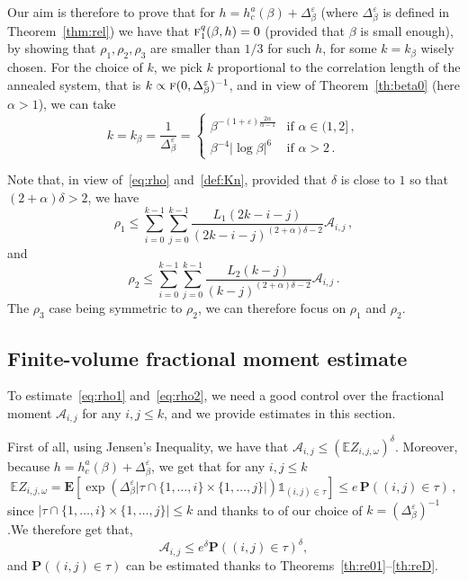 \documentclass[10pt]{amsart}
\theoremstyle{definition}\newtheorem{defi}[theo]{Definition}\newtheorem{rema}[theo]{Remark}\newtheorem{exam}[theo]{Example}\newtheorem{exem}[theo]{Example}\newtheorem{nota}[theo]{Notation}
\newcommand{\ga}{\alpha}
\newcommand{\gb}{\beta}
\newcommand{\gd}{\delta}
\newcommand{\gep}{\varepsilon}
\newcommand{\gD}{\Delta}
\newcommand{\unbf}%
{\mathds{1}}
\newcommand{\tf}{\textsc{f}} %
\newcommand{\cA}{\ensuremath{\mathcal{A}}}
\newcommand{\bP}{\ensuremath{\mathbf{P}}}
\newcommand{\bE}{\ensuremath{\mathbf{E}}}
\newcommand{\bbE}{\ensuremath{\mathbb{E}}}
\begin{document}
Our aim is therefore to prove that for $h=h_c^a(\gb) + \gD_{\gb}^{\gep}$ (where $\gD_\gb^{\gep}$ is defined in Theorem~\ref{thm:rel}) we have that $\tf_1^{q}(\gb,h) =0$ (provided that $\gb$ is small enough), by showing that $\rho_1,\rho_2,\rho_3$ are smaller than $1/3$ for such $h$, for some $k=k_{\gb}$ wisely chosen. For the choice of $k$, we pick $k$ proportional to the correlation length of the annealed system, that is $k \propto \tf(0,\gD_{\gb}^{\gep})^{-1}$, and in view of Theorem~\ref{th:beta0} (here $\ga>1$), we can take
\begin{equation}\label{def:k}
k = k_{\gb} = \frac{1}{\gD_{\gb}^{\gep}} =
\begin{cases}
\gb^{ - (1+\gep)\frac{2\ga}{\ga-1} } &\text{if } \ga\in(1,2]\,, \\
\gb^{-4} |\log \gb |^{6} &\text{if } \ga>2\,.
\end{cases}
\end{equation}



Note that, in view of~\eqref{eq:rho} and~\eqref{def:Kn}, provided that $\gd$ is close to $1$ so that $(2+\ga)\gd >2$, we have
\begin{equation}\label{eq:rho1}
\rho_1 \le \sum_{i=0}^{k-1} \sum_{j=0}^{k-1} \frac{L_1(2 k -i -j)}{(2k -i -j)^{(2+\ga) \delta - 2}} \cA_{i,j}\,,
\end{equation}
and
\begin{equation}\label{eq:rho2}
\rho_2 \le \sum_{i=0}^{k-1} \sum_{j=0}^{k-1} \frac{L_2(k-j)}{(k-j)^{(2+\ga)\delta -2}} \cA_{i,j}\,.
\end{equation}
The $\rho_3$ case being symmetric to $\rho_2$, we can therefore focus on $\rho_1$ and $\rho_2$.


\subsection{Finite-volume fractional moment estimate}\label{sec:com}
To estimate~\eqref{eq:rho1} and~\eqref{eq:rho2}, we need a good control over the fractional moment $\cA_{i,j}$ for any $i,j\leq k$, and we provide estimates in this section.

First of all, using Jensen's Inequality, we have that $\cA_{i,j} \le { (\bbE Z_{i,j,\omega})}^\delta$. Moreover, because $h=h_c^a(\gb)+\gD_{\gb}^\gep$, we get that for any $i,j\leq k$
\[
\bbE Z_{i,j,\omega} = \bE \left[\exp \left(\gD_{\gb}^{\gep} \vert \tau \cap \lbrace 1,\dots,i \rbrace \times \lbrace 1,\dots, j \rbrace \vert \right) \unbf_{(i,j)\in \tau} \right] \le e\,\bP((i,j) \in \tau)\,,
\]
since $\vert \tau \cap \lbrace 1,\dots,i \rbrace \times \lbrace 1,\dots, j \rbrace \vert \leq k$ and thanks to of our choice of $k = (\gD_{\gb}^{\gep})^{-1}$.\linebreak We therefore get that,
\begin{equation}\label{eq:ineqA}
\cA_{i,j} \leq e^{\gd} \bP((i,j) \in \tau)^{\gd},
\end{equation}
and $\bP((i,j)\in\tau)$ can be estimated thanks to Theorems~\ref{th:re01}--\ref{th:reD}.
\end{document}
